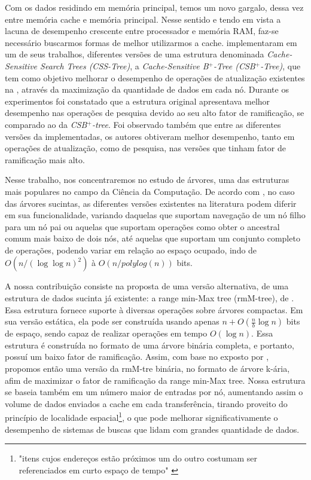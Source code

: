 Com os dados residindo em memória principal, temos um novo gargalo, dessa vez entre memória cache e memória principal. Nesse sentido e tendo em vista a lacuna de desempenho crescente entre processador e memória RAM, faz-se necessário buscarmos formas de melhor utilizarmos a cache.  \citet{paper-making-btree-cache} implementaram em um de seus trabalhos, diferentes versões de uma estrutura denominada \textit{Cache-Sensitive Search Trees (CSS-Tree)}, a \textit{Cache-Sensitive B$^+$-Tree (CSB$^+$-Tree)}, que tem como objetivo melhorar o desempenho de operações de atualização existentes na , através da maximização da quantidade de dados em cada nó. Durante os experimentos foi constatado que a estrutura original apresentava melhor desempenho nas operações de pesquisa devido ao seu alto fator de ramificação, se comparado ao da \textit{CSB$^+$-tree}. Foi observado também que entre as diferentes versões da  implementadas, os autores obtiveram melhor desempenho, tanto em operações de atualização, como de pesquisa, nas versões que tinham fator de ramificação mais alto.

Nesse trabalho, nos concentraremos no estudo de árvores, uma das estruturas mais populares no campo da Ciência da Computação. De acordo com \citet{paper-succint-trees-in-practice}, no caso das árvores sucintas, as diferentes versões existentes na literatura podem diferir em sua funcionalidade, variando daquelas que suportam navegação de um nó filho para um nó pai ou aquelas que suportam operações como obter o ancestral comum mais baixo de dois nós, até aquelas que suportam um conjunto completo de operações, podendo variar em relação ao espaço ocupado, indo  de $O(n/(\log \log n)^2)$ à $O(n/ polylog(n))$ bits.

A nossa contribuição consiste na proposta de uma versão alternativa, de uma estrutura de dados sucinta já existente: a range min-Max tree (rmM-tree), de \cite{paper-fully-functinal-succint-trees}. Essa estrutura fornece suporte à diversas operações sobre árvores compactas. Em sua versão estática, ela pode ser construída usando apenas $n + O(\frac{n}{b} \log n)$ bits de espaço, sendo capaz de realizar operações em tempo $O(\log n)$\citep{paper-fully-functinal-succint-trees}. Essa estrutura é construída no formato de uma árvore binária completa, e portanto, possuí um baixo fator de ramificação. Assim, com base no exposto por \citet{paper-making-btree-cache}, propomos então uma versão da rmM-tre binária, no formato de árvore k-ária, afim de maximizar o fator de ramificação da range min-Max tree. Nossa estrutura se baseia também em um número maior de entradas por nó, aumentando assim o volume de dados enviados a cache em cada transferência, tirando proveito do princípio de localidade espacial\footnote{"itens cujos endereços estão próximos um do outro costumam ser referenciados em curto espaço de tempo" \citep{book-computer-architecutre}}, o que pode melhorar significativamente o desempenho de sistemas de buscas que lidam com grandes quantidade de dados.



